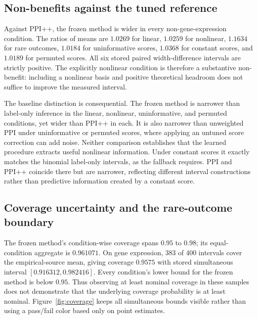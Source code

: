 \documentclass{article}
\begin{document}
\subsection{Non-benefits against the tuned reference}
Against PPI++, the frozen method is wider in every non-gene-expression condition. The ratios of means are $1.0269$ for linear, $1.0259$ for nonlinear, $1.1634$ for rare outcomes, $1.0184$ for uninformative scores, $1.0368$ for constant scores, and $1.0189$ for permuted scores. All six stored paired width-difference intervals are strictly positive. The explicitly nonlinear condition is therefore a substantive non-benefit: including a nonlinear basis and positive theoretical headroom does not suffice to improve the measured interval.

The baseline distinction is consequential. The frozen method is narrower than label-only inference in the linear, nonlinear, uninformative, and permuted conditions, yet wider than PPI++ in each. It is also narrower than unweighted PPI under uninformative or permuted scores, where applying an untuned score correction can add noise. Neither comparison establishes that the learned procedure extracts useful nonlinear information. Under constant scores it exactly matches the binomial label-only intervals, as the fallback requires. PPI and PPI++ coincide there but are narrower, reflecting different interval constructions rather than predictive information created by a constant score.

\subsection{Coverage uncertainty and the rare-outcome boundary}
The frozen method's condition-wise coverage spans $0.95$ to $0.98$; its equal-condition aggregate is $0.961071$. On gene expression, 383 of 400 intervals cover the empirical-source mean, giving coverage $0.9575$ with stored simultaneous interval $[0.916312,0.982416]$. Every condition's lower bound for the frozen method is below $0.95$. Thus observing at least nominal coverage in these samples does not demonstrate that the underlying coverage probability is at least nominal. Figure~\ref{fig:coverage} keeps all simultaneous bounds visible rather than using a pass/fail color based only on point estimates.
\end{document}
